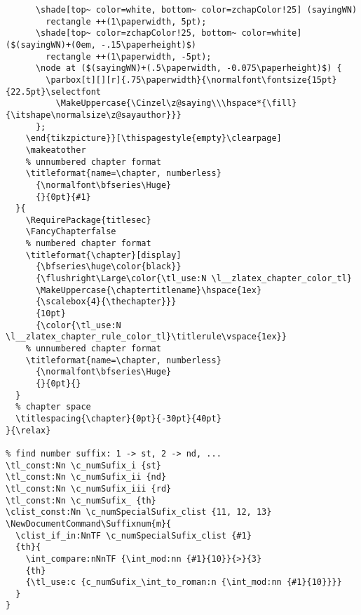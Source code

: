 \begin{verbatim}
      \shade[top~ color=white, bottom~ color=zchapColor!25] (sayingWN) 
        rectangle ++(1\paperwidth, 5pt);
      \shade[top~ color=zchapColor!25, bottom~ color=white] ($(sayingWN)+(0em, -.15\paperheight)$) 
        rectangle ++(1\paperwidth, -5pt);
      \node at ($(sayingWN)+(.5\paperwidth, -0.075\paperheight)$) {
        \parbox[t][][r]{.75\paperwidth}{\normalfont\fontsize{15pt}{22.5pt}\selectfont
          \MakeUppercase{\Cinzel\z@saying\\\hspace*{\fill}{\itshape\normalsize\z@sayauthor}}}
      };
    \end{tikzpicture}}[\thispagestyle{empty}\clearpage]
    \makeatother
    % unnumbered chapter format
    \titleformat{name=\chapter, numberless}
      {\normalfont\bfseries\Huge}
      {}{0pt}{#1}
  }{
    \RequirePackage{titlesec}
    \FancyChapterfalse
    % numbered chapter format
    \titleformat{\chapter}[display]
      {\bfseries\huge\color{black}}
      {\flushright\Large\color{\tl_use:N \l__zlatex_chapter_color_tl}
      \MakeUppercase{\chaptertitlename}\hspace{1ex}
      {\scalebox{4}{\thechapter}}}
      {10pt}
      {\color{\tl_use:N \l__zlatex_chapter_rule_color_tl}\titlerule\vspace{1ex}}
    % unnumbered chapter format
    \titleformat{name=\chapter, numberless}
      {\normalfont\bfseries\Huge}
      {}{0pt}{}
  }
  % chapter space
  \titlespacing{\chapter}{0pt}{-30pt}{40pt}
}{\relax}

% find number suffix: 1 -> st, 2 -> nd, ...
\tl_const:Nn \c_numSufix_i {st}
\tl_const:Nn \c_numSufix_ii {nd}
\tl_const:Nn \c_numSufix_iii {rd}
\tl_const:Nn \c_numSufix_ {th}
\clist_const:Nn \c_numSpecialSufix_clist {11, 12, 13}
\NewDocumentCommand\Suffixnum{m}{
  \clist_if_in:NnTF \c_numSpecialSufix_clist {#1}
  {th}{
    \int_compare:nNnTF {\int_mod:nn {#1}{10}}{>}{3}
    {th}
    {\tl_use:c {c_numSufix_\int_to_roman:n {\int_mod:nn {#1}{10}}}}
  }
}


\end{verbatim}
